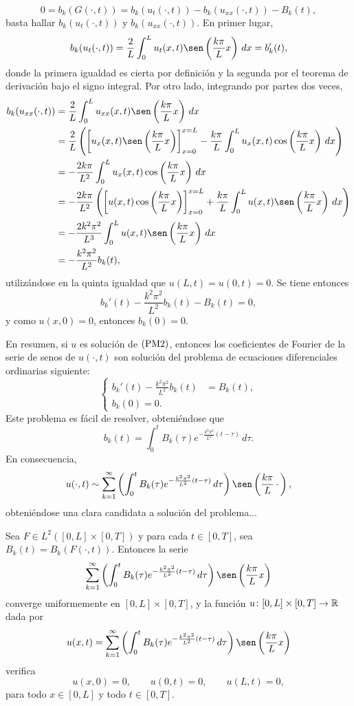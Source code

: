 \documentclass[a4paper, 12pt, extrafontsizes]{memoir}
\begin{document}
\[0 = b_k(G(\cdot,t)) = b_k(u_t(\cdot,t))-b_k(u_{xx}(\cdot,t))-B_k(t),\]
basta hallar $b_k(u_t(\cdot,t))$ y $b_k(u_{xx}(\cdot,t))$. En primer lugar,
\[b_k(u_t(\cdot,t)) = \frac{2}{L}\int_0^L u_t(x,t)\sen\left(\frac{k\pi}{L}x\right)\, dx = b_k'(t),\]
donde la primera igualdad es cierta por definición y la segunda por el teorema de derivación bajo el signo integral. Por otro lado, integrando por partes dos veces,
\begin{align*}
    b_k(u_{xx}(\cdot,t)) &= \frac{2}{L}\int_0^L u_{xx}(x,t)\sen\left(\frac{k\pi}{L}x\right) \, dx \\
    &=\frac{2}{L}\left(\left[u_x(x,t)\sen\left(\frac{k\pi}{L}x\right)\right]_{x=0}^{x=L}-\frac{k\pi}{L}\int_0^L u_x(x,t)\cos\left(\frac{k\pi}{L}x\right)\, dx\right) \\
    &=-\frac{2k\pi}{L^2}\int_0^L u_x(x,t)\cos\left(\frac{k\pi}{L}x\right)\, dx \\
    &= -\frac{2k\pi}{L^2} \left(\left[u(x,t)\cos\left(\frac{k\pi}{L}x\right)\right]_{x=0}^{x=L}+\frac{k\pi}{L}\int_0^Lu(x,t)\sen\left(\frac{k\pi}{L}x\right)\, dx\right) \\
    &= -\frac{2k^2\pi^2}{L^3} \int_0^Lu(x,t)\sen\left(\frac{k\pi}{L}x\right)\, dx \\
    &= -\frac{k^2\pi^2}{L^2}b_k(t),
\end{align*}
utilizándose en la quinta igualdad que $u(L,t)=u(0,t)=0$. Se tiene entonces
\[b_k'(t) -\frac{k^2\pi^2}{L^2}b_k(t)-B_k(t) = 0,\]
y como $u(x,0) = 0$, entonces $b_k(0) = 0$.

En resumen, si $u$ es solución de $\textup{(PM2)}$, entonces los coeficientes de Fourier de la serie de senos de $u(\cdot,t)$ son solución del problema de ecuaciones diferenciales ordinarias siguiente:
\[\left\{\begin{alignedat}{1}
    b_k'(t)-\frac{k^2\pi^2}{L^2}b_k(t) &= B_k(t), \\
    b_k(0) = 0.
\end{alignedat}\right.\]
Este problema es fácil de resolver, obteniéndose que
\[b_k(t) = \int_0^t B_k(\tau)e^{-\frac{k^2\pi^2}{L^2}(t-\tau)}\, d\tau.\]
En consecuencia,
\[u(\cdot,t) \sim \sum_{k=1}^\infty \left(\int_0^t B_k(\tau)e^{-\frac{k^2\pi^2}{L^2}(t-\tau)}\, d\tau\right)\sen\left(\frac{k\pi}{L}\, \cdot \,\right),\]
obteniéndose una clara candidata a solución del problema...

\begin{theorem}
    Sea $F \in L^2([0,L] \times [0,T])$ y para cada $t \in [0,T]$, sea $B_k(t) = B_k(F(\cdot,t))$.  Entonces la serie
    \[\sum_{k=1}^\infty \left(\int_0^t B_k(\tau)e^{-\frac{k^2\pi^2}{L^2}(t-\tau)}\, d\tau\right)\sen\left(\frac{k\pi}{L}x\right)\]
    converge uniformemente en $[0,L] \times [0,T]$, y la función $u \colon [0,L] \times [0,T] \to \mathbb R$ dada por
    \[u(x,t) =\sum_{k=1}^\infty \left(\int_0^t B_k(\tau)e^{-\frac{k^2\pi^2}{L^2}(t-\tau)}\, d\tau\right)\sen\left(\frac{k\pi}{L}x\right) \]
    verifica
    \[u(x,0) = 0, \qquad u(0,t)=0, \qquad u(L,t)=0,\]
    para todo $x\in [0,L]$ y todo $t \in [0,T]$.
\end{theorem}
\end{document}
